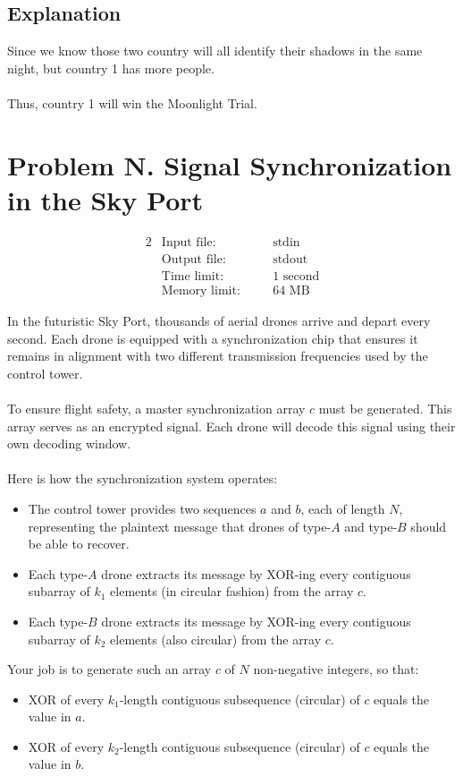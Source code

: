 \documentclass[12pt,a4paper]{article}
\begin{document}
\subsection*{\fontsize{16}{12}Explanation}
Since we know those two country will all identify their shadows in the same night, but country 1 has more people.
\\\\
\noindent
Thus, country 1 will win the Moonlight Trial.

\newpage
\section*{\fontsize{18}{12}Problem N. Signal Synchronization in the Sky Port}

\begin{alignat*}{2}
 &   \text{Input file:}   \quad     &&\text{stdin}\\
 &   \text{Output file:}  \quad     &&\text{stdout}\\
 &   \text{Time limit:}   \quad     &&\text{1 second}\\
 &   \text{Memory limit:} \quad     &&\text{64 MB}
\end{alignat*}

\noindent
In the futuristic Sky Port, thousands of aerial drones arrive and depart every second. Each drone is equipped with a synchronization chip that ensures it remains in alignment with two different transmission frequencies used by the control tower.
\\\\
\noindent
To ensure flight safety, a master synchronization array $c$ must be generated. This array serves as an encrypted signal. Each drone will decode this signal using their own decoding window.
\\\\
\noindent
Here is how the synchronization system operates:
\begin{itemize}
    \item The control tower provides two sequences $a$ and $b$, each of length $N$, representing the plaintext message that drones of type-$A$ and type-$B$ should be able to recover.
    \item Each type-$A$ drone extracts its message by XOR-ing every contiguous subarray of $k_1$ elements (in circular fashion) from the array $c$.
    \item Each type-$B$ drone extracts its message by XOR-ing every contiguous subarray of $k_2$ elements (also circular) from the array $c$.
\end{itemize}
\noindent
Your job is to generate such an array $c$ of $N$ non-negative integers, so that:
\begin{itemize}
    \item XOR of every $k_1$-length contiguous subsequence (circular) of $c$ equals the value in $a$.
    \item XOR of every $k_2$-length contiguous subsequence (circular) of $c$ equals the value in $b$.
\end{itemize}
\end{document}
